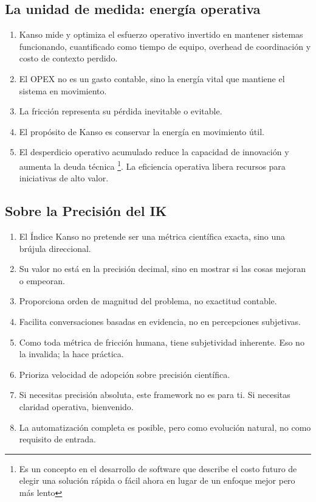 \subsection*{La unidad de medida: energía operativa}
\begin{enumerate}
    \item Kanso mide y optimiza el esfuerzo operativo invertido en mantener sistemas funcionando, cuantificado como tiempo de equipo, overhead de coordinación y costo de contexto perdido.
    \item El OPEX no es un gasto contable, sino la energía vital que mantiene el sistema en movimiento.
    \item La fricción representa su pérdida inevitable o evitable.
    \item El propósito de Kanso es conservar la energía en movimiento útil.
    \item El desperdicio operativo acumulado reduce la capacidad de innovación y aumenta la deuda técnica 
        \footnote{Es un concepto en el desarrollo de software que describe el costo futuro de elegir una solución rápida o fácil ahora en lugar de un enfoque mejor pero más lento}. 
        La eficiencia operativa libera recursos para iniciativas de alto valor.
\end{enumerate}

\subsection*{Sobre la Precisión del IK}

\begin{enumerate}
    \item El Índice Kanso no pretende ser una métrica científica exacta, sino una brújula direccional.
    \item Su valor no está en la precisión decimal, sino en mostrar si las cosas mejoran o empeoran.
    \item Proporciona orden de magnitud del problema, no exactitud contable.
    \item Facilita conversaciones basadas en evidencia, no en percepciones subjetivas.
    \item Como toda métrica de fricción humana, tiene subjetividad inherente. Eso no la invalida; la hace práctica.
    \item Prioriza velocidad de adopción sobre precisión científica.
    \item Si necesitas precisión absoluta, este framework no es para ti. Si necesitas claridad operativa, bienvenido.
    \item La automatización completa es posible, pero como evolución natural, no como requisito de entrada.
\end{enumerate}

